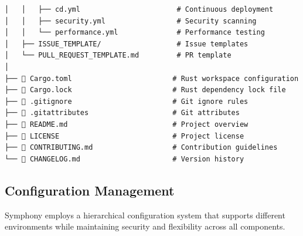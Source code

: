 \begin{lstlisting}[language=text, caption=Complete Repository Structure]
│   │   ├── cd.yml                       # Continuous deployment
│   │   ├── security.yml                 # Security scanning
│   │   └── performance.yml              # Performance testing
│   ├── ISSUE_TEMPLATE/                  # Issue templates
│   └── PULL_REQUEST_TEMPLATE.md         # PR template
│
├── 📄 Cargo.toml                        # Rust workspace configuration
├── 📄 Cargo.lock                        # Rust dependency lock file
├── 📄 .gitignore                        # Git ignore rules
├── 📄 .gitattributes                    # Git attributes
├── 📄 README.md                         # Project overview
├── 📄 LICENSE                           # Project license
├── 📄 CONTRIBUTING.md                   # Contribution guidelines
└── 📄 CHANGELOG.md                      # Version history
\end{lstlisting}

\subsection*{Configuration Management}

Symphony employs a hierarchical configuration system that supports different environments while maintaining security and flexibility across all components.

